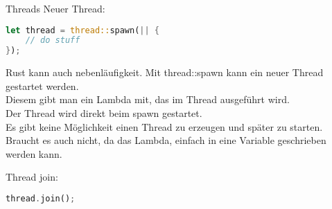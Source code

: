 
\begin{frame}[fragile,t]{Threads}
    Neuer Thread:
    \begin{lstlisting}[language=Rust,escapechar=@,label={lst:threads1-1}]
let thread = thread::spawn(|| {
    // do stuff
});\end{lstlisting}

     {
        Rust kann auch nebenläufigkeit.
        Mit thread::spawn kann ein neuer Thread gestartet werden. \\
        Diesem gibt man ein Lambda mit, das im Thread ausgeführt wird. \\
        Der Thread wird direkt beim spawn gestartet. \\
        Es gibt keine Möglichkeit einen Thread zu erzeugen und später zu starten. \\
        Braucht es auch nicht, da das Lambda, einfach in eine Variable geschrieben werden kann.
    }

    \pause
    Thread join:
    \begin{lstlisting}[language=Rust,escapechar=@,label={lst:threads1-2}]
thread.join();
\end{lstlisting}


\end{frame}

